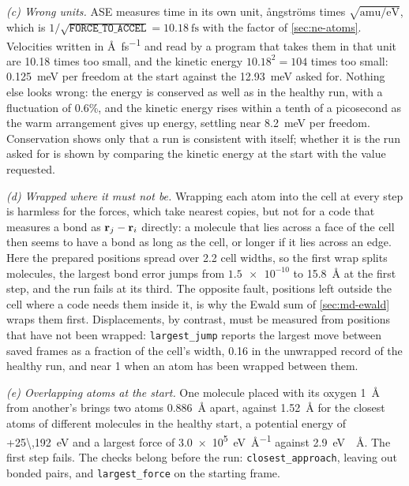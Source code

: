 \emph{(c) Wrong units.} ASE measures time in its own unit,
\aa ngstr\"oms times $\sqrt{\mathrm{amu}/\mathrm{eV}}$, which is
$1/\sqrt{\texttt{FORCE\_TO\_ACCEL}} = \SI{10.18}{\femto\second}$ with the
factor of \cref{sec:ne-atoms}. Velocities written in
\si{\angstrom\per\femto\second} and read by a program that takes them in
that unit are 10.18 times too small, and the kinetic energy $10.18^2 =
104$ times too small: \SI{0.125}{\milli\electronvolt} per freedom at the
start against the \SI{12.93}{\milli\electronvolt} asked for. Nothing else
looks wrong: the energy is conserved as well as in the healthy run, with a
fluctuation of 0.6\%, and the kinetic energy rises within a tenth of a
picosecond as the warm arrangement gives up energy, settling near
\SI{8.2}{\milli\electronvolt} per freedom. Conservation shows only that a
run is consistent with itself; whether it is the run asked for is shown by
comparing the kinetic energy at the start with the value requested.

\emph{(d) Wrapped where it must not be.} Wrapping each atom into the cell
at every step is harmless for the forces, which take nearest copies, but
not for a code that measures a bond as $\bm{\mathrm{r}}_j - \bm{\mathrm{r}}_i$ directly: a
molecule that lies across a face of the cell then seems to have a bond as
long as the cell, or longer if it lies across an edge. Here the prepared
positions spread over 2.2 cell widths, so the first wrap splits
molecules, the largest bond error jumps from $\num{1.5e-10}$ to
\SI{15.8}{\angstrom} at the first step, and the run fails at its third.
The opposite fault, positions left outside the cell where a code needs
them inside it, is why the Ewald sum of \cref{sec:md-ewald} wraps them
first. Displacements, by contrast, must be measured from positions that
have not been wrapped: \texttt{largest\_jump} reports the largest move
between saved frames as a fraction of the cell's width, 0.16 in the
unwrapped record of the healthy run, and near 1 when an atom has been
wrapped between them.

\emph{(e) Overlapping atoms at the start.} One molecule placed with its
oxygen \SI{1}{\angstrom} from another's brings two atoms
\SI{0.886}{\angstrom} apart, against \SI{1.52}{\angstrom} for the closest
atoms of different molecules in the healthy start, a potential energy of
\SI{+25\,192}{\electronvolt} and a largest force of
\SI{3.0e5}{\electronvolt\per\angstrom} against \SI{2.9}{\electronvolt
\per\angstrom}. The first step fails. The checks belong before the run:
\texttt{closest\_approach}, leaving out bonded pairs, and
\texttt{largest\_force} on the starting frame.


